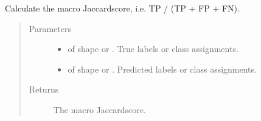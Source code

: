 \documentclass[letterpaper,10pt,english]{sphinxmanual}
\begin{document}
\begin{fulllineitems}
\label{\detokenize{pusion.evaluation.evaluation_metrics:pusion.evaluation.evaluation_metrics.macro_jaccard}}
\sphinxAtStartPar
Calculate the macro Jaccard\sphinxhyphen{}score, i.e. TP / (TP + FP + FN).
\begin{quote}\begin{description}
\item[{Parameters}] \leavevmode\begin{itemize}
\item {} 
\sphinxAtStartPar
{} \textendash{}  of shape  or . True labels or class assignments.

\item {} 
\sphinxAtStartPar
{} \textendash{}  of shape  or . Predicted labels or
class assignments.

\end{itemize}

\item[{Returns}] \leavevmode
\sphinxAtStartPar
The macro Jaccard\sphinxhyphen{}score.

\end{description}\end{quote}

\end{fulllineitems}

\end{document}
